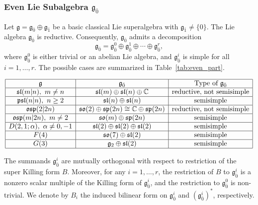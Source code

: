 \documentclass[11pt]{amsart}
\def\even{{\mathfrak{g}_{\bar{0}}}}
\def\odd{{\mathfrak{g}_{\bar{1}}}}
\def\gg{{\mathfrak{g}}}
\theoremstyle{plain}
\theoremstyle{remark}
\theoremstyle{definition}
\numberwithin{equation}{section}
\theoremstyle{remark}
\begin{document}
\subsubsection{Even Lie Subalgebra \texorpdfstring{$\even$}{}} 
Let $\gg=\even \oplus \odd$ be a basic classical Lie superalgebra with $\odd \neq \{0\}$.
The Lie algebra $\even$ is reductive.
Consequently, $\even$ admits a decomposition
\begin{equation}
\even
=
\gg_{\bar{0}}^{0}
\oplus
\gg_{\bar{0}}^{1}
\oplus
\cdots
\oplus
\gg_{\bar{0}}^{r},
\end{equation}
where $\gg_{\bar{0}}^{0}$ is either trivial or an abelian Lie algebra, and $\gg_{\bar{0}}^{i}$ is simple for all
$i=1,\ldots,r$. The possible cases are summarized in Table~\ref{tab:even_part}.

\begin{table}
\centering
\[
\begin{array}{|c|c|c|}
\hline
\gg & \gg_{\bar 0} & \text{Type of }\gg_{\bar 0}\\
\hline
\mathfrak{sl}(m\vert n),\ m\neq n
& \mathfrak{sl}(m)\oplus \mathfrak{sl}(n)\oplus \mathbb C
& \text{reductive, not semisimple}\\
\hline
\mathfrak{psl}(n\vert n), \ n\geq 2
& \mathfrak{sl}(n)\oplus \mathfrak{sl}(n)
& \text{semisimple}\\
\hline
\mathfrak{osp}(2\vert 2n)
& \mathfrak{so}(2)\oplus \mathfrak{sp}(2n)\cong \mathbb C\oplus\mathfrak{sp}(2n)
& \text{reductive, not semisimple}\\
\hline
\mathfrak{osp}(m\vert 2n),\ m\neq 2
& \mathfrak{so}(m)\oplus \mathfrak{sp}(2n)
& \text{semisimple}\\
\hline
D(2,1;\alpha), \ \alpha\neq 0,-1
& \mathfrak{sl}(2)\oplus \mathfrak{sl}(2)\oplus \mathfrak{sl}(2)
& \text{semisimple}\\
\hline
F(4)
& \mathfrak{so}(7)\oplus \mathfrak{sl}(2)
& \text{semisimple}\\
\hline
G(3)
& \gg_2\oplus \mathfrak{sl}(2)
& \text{semisimple}\\
\hline
\end{array}
\]
\caption{Even Lie subalgebras of basic classical Lie superalgebras}
\label{tab:even_part}
\end{table}

The summands $\gg_{\bar{0}}^{i}$ are mutually orthogonal with respect to restriction of the super Killing form $B$. Moreover, for any $i=1,\ldots,r$, the restriction of $B$ to $\gg_{\bar{0}}^{i}$ is a nonzero scalar multiple of the Killing form of
$\gg_{\bar{0}}^{i}$, and the restriction to $\gg_{\bar{0}}^{0}$ is non-trivial.
We denote by $B_{i}$ the induced bilinear form on $\gg_{\bar{0}}^{i}$ and $(\gg_{\bar{0}}^{i})^{\ast}$, respectively.
\end{document}
